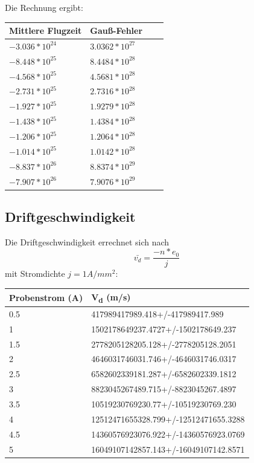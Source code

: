 \documentclass[titlepage=firstcover, captions=tableheading]{scrartcl}
\begin{document}
Die Rechnung ergibt:
\begin{center}
    \begin{tabular}{l @{${}\pm{}$}lll}\\
    \toprule
    Mittlere Flugzeit & Gauß-Fehler\\
    \midrule
    $-3.036*10^{24}$ &  $3.0362*10^{27}$ \\
    $-8.448*10^{25}$ &  $8.4484*10^{28}$ \\
    $-4.568*10^{25}$ &  $4.5681*10^{28}$ \\
    $-2.731*10^{25}$ &  $2.7316*10^{28}$ \\
    $-1.927*10^{25}$ &  $1.9279*10^{28}$ \\
    $-1.438*10^{25}$ &  $1.4384*10^{28}$ \\
    $-1.206*10^{25}$ &  $1.2064*10^{28}$ \\
    $-1.014*10^{25}$ &  $1.0142*10^{28}$ \\
    $-8.837*10^{26}$ &  $8.8374*10^{29}$ \\
    $-7.907*10^{26}$ &  $7.9076*10^{29}$ \\
    \bottomrule
    \end{tabular}
\end{center}


\subsection{Driftgeschwindigkeit}
Die Driftgeschwindigkeit errechnet sich nach
\begin{equation}
    \bar{v_d}=\frac{-n*e_0}{j}
\end{equation}
mit Stromdichte $j=1 A/mm^2$:
\begin{center}
    \begin{tabular}{ll}
        \toprule
        Probenstrom (A) & V\textsubscript{d} (m/s) \\
        \midrule  
        0.5       & 417989417989.418+/-417989417.989     \\
        1         &  1502178649237.4727+/-1502178649.237  \\
        1.5       &   2778205128205.128+/-2778205128.2051  \\
        2         &   4646031746031.746+/-4646031746.0317  \\
        2.5       &   6582602339181.287+/-6582602339.1812 \\
        3         &  8823045267489.715+/-8823045267.4897  \\
        3.5       &   10519230769230.77+/-10519230769.230 \\
        4         &   12512471655328.799+/-12512471655.3288    \\
        4.5       &   14360576923076.922+/-14360576923.0769  \\
        5         &   16049107142857.143+/-16049107142.8571   \\
        \bottomrule
    \end{tabular}
\end{center}
\end{document}
